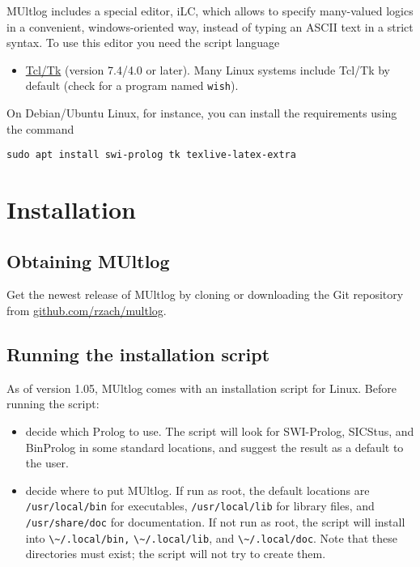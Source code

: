 \documentclass[]{article}
\newcommand{\passthrough}[1]{#1}
\providecommand{\tightlist}{%
  \setlength{\itemsep}{0pt}\setlength{\parskip}{0pt}}
\begin{document}
MUltlog includes a special editor, iLC, which allows to specify
many-valued logics in a convenient, windows-oriented way, instead of
typing an ASCII text in a strict syntax. To use this editor you need the
script language

\begin{itemize}
\tightlist
\item
  \href{https://www.tcl.tk/}{Tcl/Tk} (version 7.4/4.0 or later). Many
  Linux systems include Tcl/Tk by default (check for a program named
  \passthrough{\lstinline!wish!}).
\end{itemize}

On Debian/Ubuntu Linux, for instance, you can install the requirements
using the command

\begin{lstlisting}
sudo apt install swi-prolog tk texlive-latex-extra
\end{lstlisting}

\hypertarget{installation}{%
\section{Installation}\label{installation}}

\hypertarget{obtaining-multlog}{%
\subsection{Obtaining MUltlog}\label{obtaining-multlog}}

Get the newest release of MUltlog by cloning or downloading the Git
repository from
\href{https://github.com/rzach/multlog}{github.com/rzach/multlog}.

\hypertarget{running-the-installation-script}{%
\subsection{Running the installation
script}\label{running-the-installation-script}}

As of version 1.05, MUltlog comes with an installation script for Linux.
Before running the script:

\begin{itemize}
\item
  decide which Prolog to use. The script will look for SWI-Prolog,
  SICStus, and BinProlog in some standard locations, and suggest the
  result as a default to the user.
\item
  decide where to put MUltlog. If run as root, the default locations are
  \passthrough{\lstinline!/usr/local/bin!} for executables,
  \passthrough{\lstinline!/usr/local/lib!} for library files, and
  \passthrough{\lstinline!/usr/share/doc!} for documentation. If not run
  as root, the script will install into
  \passthrough{\lstinline!\~/.local/bin,!}
  \passthrough{\lstinline!\~/.local/lib!}, and
  \passthrough{\lstinline!\~/.local/doc!}. Note that these directories
  must exist; the script will not try to create them.
\end{itemize}
\end{document}
